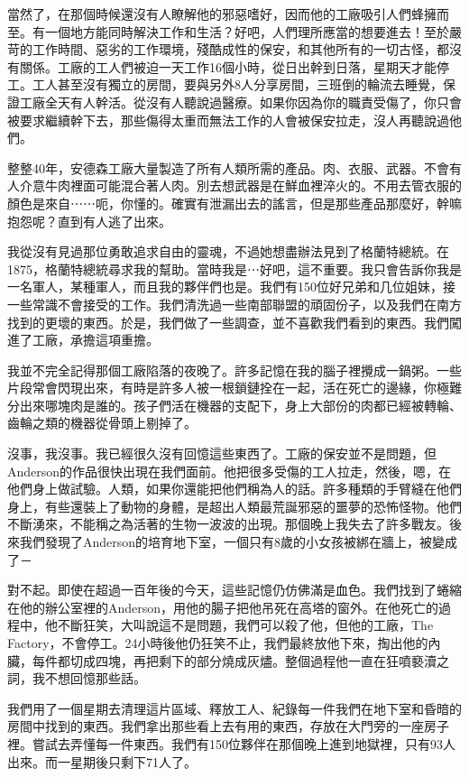 當然了，在那個時候還沒有人瞭解他的邪惡嗜好，因而他的工廠吸引人們蜂擁而至。有一個地方能同時解決工作和生活？好吧，人們理所應當的想要進去！至於嚴苛的工作時間、惡劣的工作環境，殘酷成性的保安，和其他所有的一切古怪，都沒有關係。工廠的工人們被迫一天工作16個小時，從日出幹到日落，星期天才能停工。工人甚至沒有獨立的房間，要與另外8人分享房間，三班倒的輪流去睡覺，保證工廠全天有人幹活。從沒有人聽說過醫療。如果你因為你的職責受傷了，你只會被要求繼續幹下去，那些傷得太重而無法工作的人會被保安拉走，沒人再聽說過他們。

整整40年，安德森工廠大量製造了所有人類所需的產品。肉、衣服、武器。不會有人介意牛肉裡面可能混合著人肉。別去想武器是在鮮血裡淬火的。不用去管衣服的顏色是來自⋯⋯呃，你懂的。確實有泄漏出去的謠言，但是那些產品那麼好，幹嘛抱怨呢？直到有人逃了出來。

我從沒有見過那位勇敢追求自由的靈魂，不過她想盡辦法見到了格蘭特總統。在1875，格蘭特總統尋求我的幫助。當時我是⋯好吧，這不重要。我只會告訴你我是一名軍人，某種軍人，而且我的夥伴們也是。我們有150位好兄弟和几位姐妹，接一些常識不會接受的工作。我們清洗過一些南部聯盟的頑固份子，以及我們在南方找到的更壞的東西。於是，我們做了一些調查，並不喜歡我們看到的東西。我們闖進了工廠，承擔這項重擔。

我並不完全記得那個工廠陷落的夜晚了。許多記憶在我的腦子裡攪成一鍋粥。一些片段常會閃現出來，有時是許多人被一根鎖鏈拴在一起，活在死亡的邊緣，你極難分出來哪塊肉是誰的。孩子們活在機器的支配下，身上大部份的肉都已經被轉輪、齒輪之類的機器從骨頭上剔掉了。

沒事，我沒事。我已經很久沒有回憶這些東西了。工廠的保安並不是問題，但Anderson的作品很快出現在我們面前。他把很多受傷的工人拉走，然後，嗯，在他們身上做試驗。人類，如果你還能把他們稱為人的話。許多種類的手臂縫在他們身上，有些還裝上了動物的身體，是超出人類最荒誕邪惡的噩夢的恐怖怪物。他們不斷湧來，不能稱之為活著的生物一波波的出現。那個晚上我失去了許多戰友。後來我們發現了Anderson的培育地下室，一個只有8歲的小女孩被綁在牆上，被變成了－

對不起。即使在超過一百年後的今天，這些記憶仍仿佛滿是血色。我們找到了蜷縮在他的辦公室裡的Anderson，用他的腸子把他吊死在高塔的窗外。在他死亡的過程中，他不斷狂笑，大叫說這不是問題，我們可以殺了他，但他的工廠，The Factory，不會停工。24小時後他仍狂笑不止，我們最終放他下來，掏出他的內臟，每件都切成四塊，再把剩下的部分燒成灰燼。整個過程他一直在狂噴褻瀆之詞，我不想回憶那些話。

我們用了一個星期去清理這片區域、釋放工人、紀錄每一件我們在地下室和昏暗的房間中找到的東西。我們拿出那些看上去有用的東西，存放在大門旁的一座房子裡。嘗試去弄懂每一件東西。我們有150位夥伴在那個晚上進到地獄裡，只有93人出來。而一星期後只剩下71人了。

